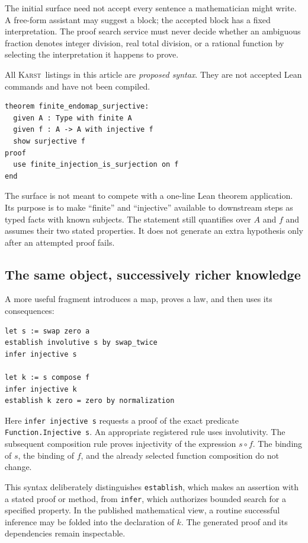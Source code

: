 \documentclass[11pt,letterpaper]{article}
\newcommand{\code}[1]{\nolinkurl{#1}}
\newcommand{\Karst}{\textsc{Karst}}
\theoremstyle{remark}
\begin{document}
The initial surface need not accept every sentence a mathematician might write.
A free-form assistant may suggest a block; the accepted block has a fixed
interpretation. The proof search service must never decide whether an ambiguous
fraction denotes integer division, real total division, or a rational function
by selecting the interpretation it happens to prove.

All \Karst\ listings in this article are \emph{proposed syntax}. They are not
accepted Lean commands and have not been compiled.

\begin{lstlisting}[caption={A refinement-oriented mathematical declaration.}]
theorem finite_endomap_surjective:
  given A : Type with finite A
  given f : A -> A with injective f
  show surjective f
proof
  use finite_injection_is_surjection on f
end
\end{lstlisting}

The surface is not meant to compete with a one-line Lean theorem application.
Its purpose is to make ``finite'' and ``injective'' available to downstream
steps as typed facts with known subjects. The statement still quantifies over
$A$ and $f$ and assumes their two stated properties. It does not generate an
extra hypothesis only after an attempted proof fails.

\subsection{The same object, successively richer knowledge}
A more useful fragment introduces a map, proves a law, and then uses its
consequences:
\begin{lstlisting}[caption={Refinement grows without rebinding the map.}]
let s := swap zero a
establish involutive s by swap_twice
infer injective s

let k := s compose f
infer injective k
establish k zero = zero by normalization
\end{lstlisting}

Here \code{infer injective s} requests a proof of the exact predicate
\code{Function.Injective s}. An appropriate registered rule uses involutivity.
The subsequent composition rule proves injectivity of the expression $s\circ f$.
The binding of $s$, the binding of $f$, and the already selected function
composition do not change.

This syntax deliberately distinguishes \code{establish}, which makes an
assertion with a stated proof or method, from \code{infer}, which authorizes
bounded search for a specified property. In the published mathematical view,
a routine successful inference may be folded into the declaration of $k$.
The generated proof and its dependencies remain inspectable.
\end{document}
